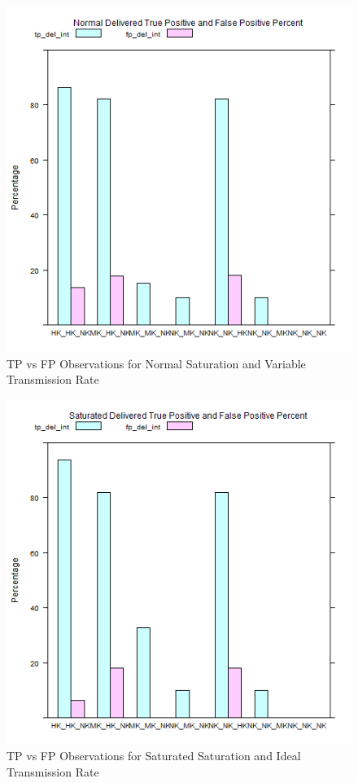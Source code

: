 	\begin{figure}[H]
	\centering
	\includegraphics[width=\textwidth]{Chap7/figures/plots/normal_variable/tpvsfp_percent.png}
	\caption{TP vs FP Observations for Normal Saturation and Variable Transmission Rate}
	\label{fig:sim:res:norm:variable:tpfp}
	\end{figure}

	\begin{figure}[H]
	\centering
	\includegraphics[width=\textwidth]{Chap7/figures/plots/saturated_ideal/tpvsfp_percent.png}
	\caption{TP vs FP Observations for Saturated Saturation and Ideal Transmission Rate}
	\label{fig:sim:res:sat:ideal:tpfp}
	\end{figure}

